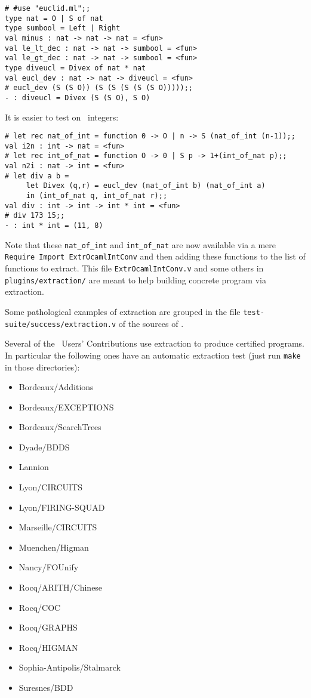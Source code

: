 \begin{verbatim}
# #use "euclid.ml";;
type nat = O | S of nat
type sumbool = Left | Right
val minus : nat -> nat -> nat = <fun>
val le_lt_dec : nat -> nat -> sumbool = <fun>
val le_gt_dec : nat -> nat -> sumbool = <fun>
type diveucl = Divex of nat * nat
val eucl_dev : nat -> nat -> diveucl = <fun>
# eucl_dev (S (S O)) (S (S (S (S (S O)))));;
- : diveucl = Divex (S (S O), S O)
\end{verbatim}
It is easier to test on \ocaml\ integers:
\begin{verbatim}
# let rec nat_of_int = function 0 -> O | n -> S (nat_of_int (n-1));;
val i2n : int -> nat = <fun>
# let rec int_of_nat = function O -> 0 | S p -> 1+(int_of_nat p);;
val n2i : nat -> int = <fun>
# let div a b = 
     let Divex (q,r) = eucl_dev (nat_of_int b) (nat_of_int a)
     in (int_of_nat q, int_of_nat r);;
val div : int -> int -> int * int = <fun>
# div 173 15;;
- : int * int = (11, 8)
\end{verbatim}

Note that these {\tt nat\_of\_int} and {\tt int\_of\_nat} are now
available via a mere {\tt Require Import ExtrOcamlIntConv} and then
adding these functions to the list of functions to extract. This file
{\tt ExtrOcamlIntConv.v} and some others in {\tt plugins/extraction/}
are meant to help building concrete program via extraction.


Some pathological examples of extraction are grouped in the file
{\tt test-suite/success/extraction.v} of the sources of \Coq.


 Several of the \Coq\ Users' Contributions use extraction to produce 
 certified programs. In particular the following ones have an automatic 
 extraction test (just run {\tt make} in those directories): 

 \begin{itemize}
 \item Bordeaux/Additions
 \item Bordeaux/EXCEPTIONS
 \item Bordeaux/SearchTrees
 \item Dyade/BDDS
 \item Lannion
 \item Lyon/CIRCUITS
 \item Lyon/FIRING-SQUAD
 \item Marseille/CIRCUITS
 \item Muenchen/Higman
 \item Nancy/FOUnify
 \item Rocq/ARITH/Chinese
 \item Rocq/COC
 \item Rocq/GRAPHS
 \item Rocq/HIGMAN
 \item Sophia-Antipolis/Stalmarck
 \item Suresnes/BDD
 \end{itemize}

